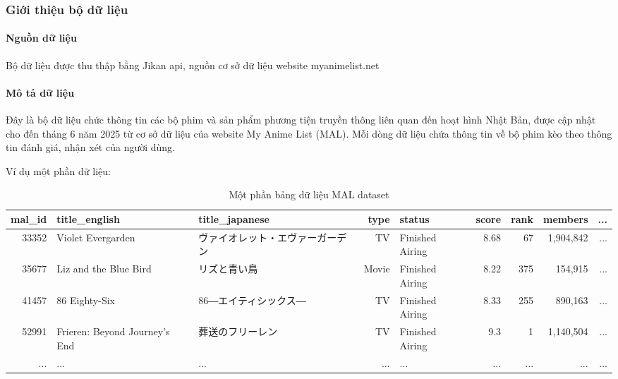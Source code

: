 \subsubsection{Giới thiệu bộ dữ liệu}
    \paragraph{Nguồn dữ liệu}
    \leavevmode

    Bộ dữ liệu được thu thập bằng Jikan api, nguồn cơ sở dữ liệu website myanimelist.net 

    \paragraph{Mô tả dữ liệu}
    \leavevmode

    Đây là bộ dữ liệu chức thông tin các bộ phim và sản phẩm phương tiện truyền thông liên quan đến hoạt hình Nhật Bản, được cập nhật cho đến tháng 6 năm 2025 từ cơ sở dữ liệu của website My Anime List (MAL). Mỗi dòng dữ liệu chứa thông tin về bộ phim kèo theo thông tin đánh giá, nhận xét của người dùng.

    Ví dụ một phần dữ liệu:

    \begin{CJK}{UTF8}{gbsn}
    \begin{table}[htbp]
    \centering
    \caption{Một phần bảng dữ liệu MAL dataset}
    \label{tab:stat-mal-exp}
        \begin{tabular}{|r|p{3cm}|p{2.75cm}|r|p{1.6cm}|r|r|r|r|}
        \hline
        mal\_id & title\_english & title\_japanese & type & status & score & rank & members & ... \\
        \hline
        33352 & Violet Evergarden & ヴァイオレット・エヴァーガーデン & TV & Finished Airing & 8.68 & 67 & 1,904,842 & ... \\
        \hline
        35677 & Liz and the Blue Bird & リズと青い鳥 & Movie & Finished Airing & 8.22 & 375 & 154,915 & ... \\
        \hline
        41457 & 86 Eighty-Six & 86―エイティシックス― & TV & Finished Airing & 8.33 & 255 & 890,163 & ... \\
        \hline
        52991 & Frieren: Beyond Journey's End & 葬送のフリーレン & TV & Finished Airing & 9.3 & 1 & 1,140,504 & ... \\
        \hline
        ... & ... & ... & ... & ... & ... & ... & ... & ... \\
        \hline
        \end{tabular}

    \end{table}
    \end{CJK}

